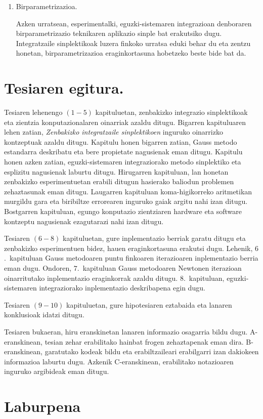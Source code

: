 \begin{enumerate}
\item Birparametrizazioa.

Azken urratsean, esperimentalki, eguzki-sistemaren integrazioan  denboraren birparametrizazio teknikaren aplikazio sinple bat erakutsiko dugu. Integratzaile sinplektikoak luzera finkoko urratsa eduki behar du eta zentzu honetan, birparametrizazioa eraginkortasuna hobetzeko beste bide bat da.      

\end{enumerate}        


\section{Tesiaren egitura.}

Tesiaren lehenengo $(1-5)$ kapituluetan, zenbakizko integrazio sinplektikoak eta zientzia konputazionalaren oinarriak azaldu ditugu. Bigarren kapituluaren lehen zatian, \emph{Zenbakizko integratzaile sinplektikoen} inguruko oinarrizko kontzeptuak azaldu ditugu. Kapitulu honen bigarren zatian, Gauss metodo estandarra deskribatu eta bere propietate nagusienak eman ditugu. Kapitulu honen azken zatian, eguzki-sistemaren integraziorako metodo sinplektiko eta esplizitu nagusienak laburtu ditugu. Hirugarren kapituluan, lan honetan zenbakizko esperimentuetan erabili ditugun hasierako baliodun problemen zehaztasunak eman ditugu. Laugarren kapituluan koma-higikorreko aritmetikan murgildu gara eta biribiltze errorearen inguruko gaiak argitu nahi izan ditugu. Bostgarren kapituluan, egungo konputazio zientziaren hardware eta software kontzeptu nagusienak ezagutarazi nahi izan ditugu.     

Tesiaren $(6-8)$ kapituluetan, gure inplementazio berriak garatu ditugu eta zenbakizko esperimentuen bidez, hauen eraginkortasuna erakutsi dugu. Lehenik, $6$.~kapituluan Gauss metodoaren puntu finkoaren iterazioaren inplementazio berria eman dugu. Ondoren, $7$.~kapituluan Gauss metodoaren Newtonen iterazioan oinarritutako inplementazio eraginkorrak azaldu ditugu. $8$.~kapituluan, eguzki-sistemaren integraziorako inplementazio deskribapena egin dugu.  

Tesiaren $(9-10)$ kapituluetan, gure hipotesiaren eztabaida eta lanaren konklusioak idatzi ditugu.

Tesiaren bukaeran, hiru eranskinetan lanaren informazio osagarria bildu dugu. A-eranskinean, tesian zehar erabilitako hainbat frogen zehaztapenak eman dira. B-eranskinean, garatutako kodeak bildu eta erabiltzaileari erabilgarri izan dakiokeen informazioa laburtu dugu. Azkenik C-eranskinean, erabilitako notazioaren inguruko argibideak eman ditugu.

      
      
\section{Laburpena}

